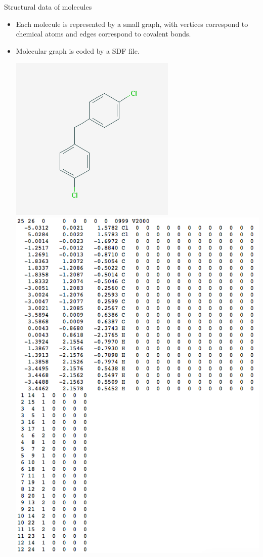 \documentclass[first=dgreen,second=purple,logo=yellowexc]{aaltoslides}
\begin{document}
{\begin{frame}{Structural data of molecules}
	\begin{itemize}
		\item Each molecule is represented by a small graph, with vertices correspond to chemical atoms and edges correspond to covalent bonds.
		\item Molecular graph is coded by a SDF file.
		\begin{center}
			\includegraphics[scale=0.2]{./figures/cpd.png}
			\text{   }
			\includegraphics[scale=0.2]{./figures/cpd_sdf.png}
		\end{center}
		

\end{itemize}
\end{frame}}
\end{document}
